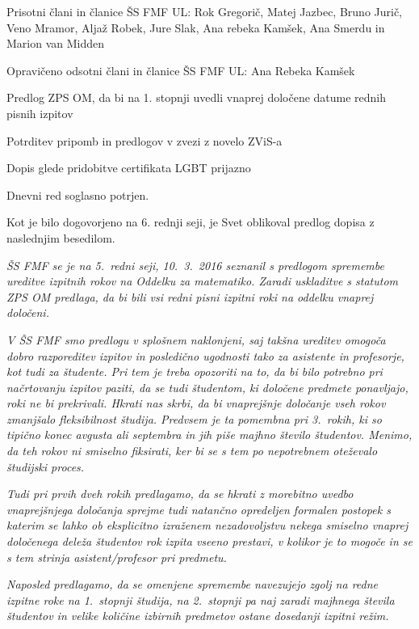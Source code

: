 \documentclass{seja}
\begin{document}
Prisotni člani in članice ŠS FMF UL:
Rok Gregorič, Matej Jazbec, Bruno Jurič, Veno Mramor, Aljaž
Robek, Jure Slak, Ana rebeka Kamšek, Ana Smerdu in Marion van Midden

Opravičeno odsotni člani in članice ŠS FMF UL: Ana Rebeka Kamšek

\begin{red}
\item Predlog ZPS OM, da bi na 1. stopnji uvedli vnaprej določene datume rednih pisnih izpitov
\item Potrditev pripomb in predlogov v zvezi z novelo ZViS-a
\item Dopis glede pridobitve certifikata LGBT prijazno
\end{red}
Dnevni red soglasno potrjen.

\begin{ad}

\item Kot je bilo dogovorjeno na 6. rednji seji, je Svet oblikoval predlog dopisa z naslednjim besedilom.

\emph{ŠS FMF se je na 5.~redni seji, 10.~3.~2016 seznanil s predlogom spremembe ureditve izpitnih rokov na Oddelku za matematiko. Zaradi uskladitve s statutom ZPS OM predlaga, da bi bili vsi redni pisni izpitni roki na oddelku vnaprej določeni.}

\emph{V ŠS FMF smo predlogu v splošnem naklonjeni, saj takšna ureditev omogoča dobro razporeditev
izpitov in posledično ugodnosti tako za asistente in profesorje, kot tudi za študente. Pri tem je treba opozoriti na to, da bi bilo potrebno pri načrtovanju izpitov paziti, da se tudi študentom, ki določene predmete ponavljajo, roki ne bi prekrivali. Hkrati nas skrbi, da bi vnaprejšnje določanje vseh rokov zmanjšalo fleksibilnost študija. Predvsem je ta pomembna pri 3.~rokih, ki so tipično konec avgusta ali septembra in jih piše majhno število študentov. Menimo, da teh rokov ni smiselno fiksirati, ker bi se s tem po nepotrebnem oteževalo študijski proces.}

\emph{Tudi pri prvih dveh rokih predlagamo, da se hkrati z morebitno uvedbo vnaprejšnjega določanja
sprejme tudi natančno opredeljen formalen postopek s katerim se lahko ob eksplicitno izraženem
nezadovoljstvu nekega smiselno vnaprej določenega deleža študentov rok izpita vseeno prestavi, v kolikor je to mogoče in se s tem strinja asistent/profesor pri predmetu.}

\emph{Naposled predlagamo, da se omenjene spremembe navezujejo zgolj na redne izpitne roke na 1.~stopnji študija, na 2.~stopnji pa naj zaradi majhnega števila študentov in velike količine izbirnih predmetov ostane dosedanji izpitni režim.}


\end{ad}
\end{document}

